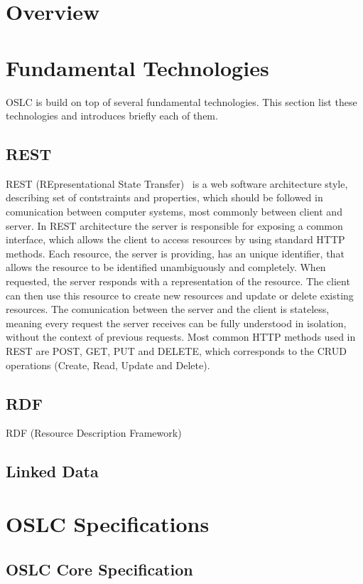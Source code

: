 \section{Overview}

\section{Fundamental Technologies}
OSLC is build on top of several fundamental technologies. This section list these technologies and introduces briefly each of them.

\subsection*{REST}
REST (REpresentational State Transfer) \cite{rest} is a web software architecture style, describing set of contstraints and properties, which should be followed in comunication between computer systems, most commonly between client and server. In REST architecture the server is responsible for exposing a common interface, which allows the client to access resources by using standard HTTP methods. Each resource, the server is providing, has an unique identifier, that allows the resource to be identified unambiguously and completely. When requested, the server responds with a representation of the resource. The client can then use this resource to create new resources and update or delete existing resources. The comunication between the server and the client is stateless, meaning every request the server receives can be fully understood in isolation, without the context of previous requests. Most common HTTP methods used in REST are POST, GET, PUT and DELETE, which corresponds to the CRUD operations (Create, Read, Update and Delete).

\subsection*{RDF}
RDF (Resource Description Framework) \cite{rdf}

\subsection*{Linked Data}

\section{OSLC Specifications}

\subsection*{OSLC Core Specification}


